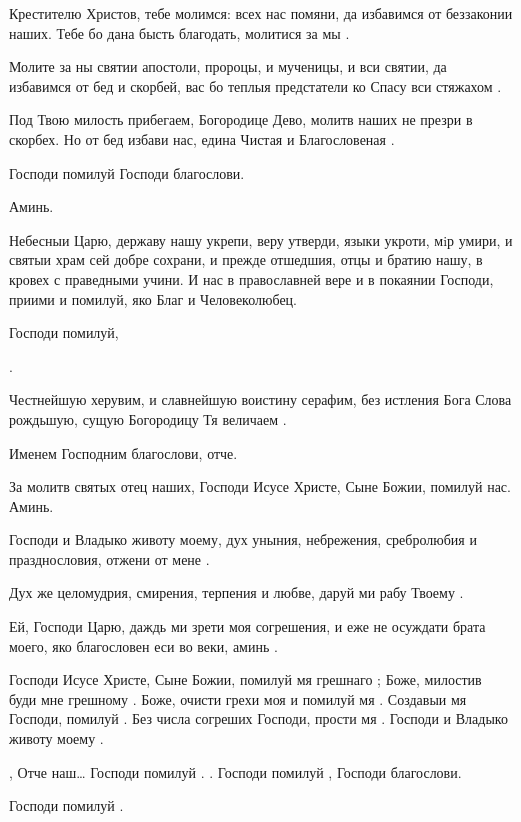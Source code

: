 \begin{mymulticols}
 Крестителю Христов, тебе молимся: всех нас помяни, да избавимся от беззаконии наших. Тебе бо дана бысть благодать, молитися за мы .

 Молите за ны святии апостоли, пророцы, и мученицы, и вси святии, да избавимся от бед и скорбей, вас бо теплыя предстатели ко Спасу вси стяжахом .

 Под Твою милость прибегаем, Богородице Дево, молитв наших не презри в скорбех. Но от бед избави нас, едина Чистая и Благословеная .

Господи помилуй  Господи благослови.

 Аминь. 

Небесныи Царю, державу нашу укрепи, веру утверди, языки укроти, мiр умири, и святыи храм сей добре сохрани, и прежде отшедшия, отцы и братию нашу, в кровех с праведными учини. И нас в православней вере и в покаянии Господи, приими и помилуй, яко Благ и Человеколюбец. 

 Господи помилуй, 

.

Честнейшую херувим, и славнейшую воистину серафим, без истления Бога Слова рождьшую, сущую Богородицу Тя величаем .

Именем Господним благослови, отче.

За молитв святых отец наших, Господи Исусе Христе, Сыне Божии, помилуй нас. Аминь. 


Господи и Владыко животу моему, дух уныния, небрежения, сребролюбия и празднословия, отжени от мене .

Дух же целомудрия, смирения, терпения и любве, даруй ми рабу Твоему .

Ей, Господи Царю, даждь ми зрети моя согрешения, и еже не осуждати брата моего, яко благословен еси во веки, аминь .

 Господи Исусе Христе, Сыне Божии, помилуй мя грешнаго ; Боже, милостив буди мне грешному . Боже, очисти грехи моя и помилуй мя . Создавыи мя Господи, помилуй . Без числа согреших Господи, прости мя .  Господи и Владыко животу моему .

 ,  Отче наш… Господи помилуй . . Господи помилуй , Господи благослови. 

Господи помилуй . 


\end{mymulticols}

